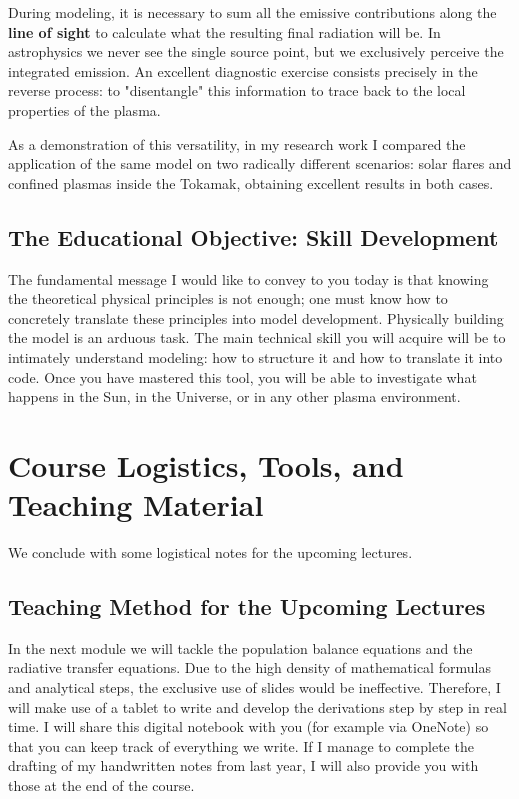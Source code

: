     During modeling, it is necessary to sum all the emissive contributions along the \textbf{line of sight} to calculate what the resulting final radiation will be. In astrophysics we never see the single source point, but we exclusively perceive the integrated emission. An excellent diagnostic exercise consists precisely in the reverse process: to "disentangle" this information to trace back to the local properties of the plasma.
    
    As a demonstration of this versatility, in my research work I compared the application of the same model on two radically different scenarios: solar flares and confined plasmas inside the Tokamak, obtaining excellent results in both cases.
    
    \subsection{The Educational Objective: Skill Development}
    
    The fundamental message I would like to convey to you today is that knowing the theoretical physical principles is not enough; one must know how to concretely translate these principles into model development. Physically building the model is an arduous task.
    The main technical skill you will acquire will be to intimately understand modeling: how to structure it and how to translate it into code. Once you have mastered this tool, you will be able to investigate what happens in the Sun, in the Universe, or in any other plasma environment.

\section{Course Logistics, Tools, and Teaching Material}

We conclude with some logistical notes for the upcoming lectures.

    \subsection{Teaching Method for the Upcoming Lectures}
    In the next module we will tackle the population balance equations and the radiative transfer equations. Due to the high density of mathematical formulas and analytical steps, the exclusive use of slides would be ineffective. Therefore, I will make use of a tablet to write and develop the derivations step by step in real time.
    I will share this digital notebook with you (for example via OneNote) so that you can keep track of everything we write. If I manage to complete the drafting of my handwritten notes from last year, I will also provide you with those at the end of the course.
    
